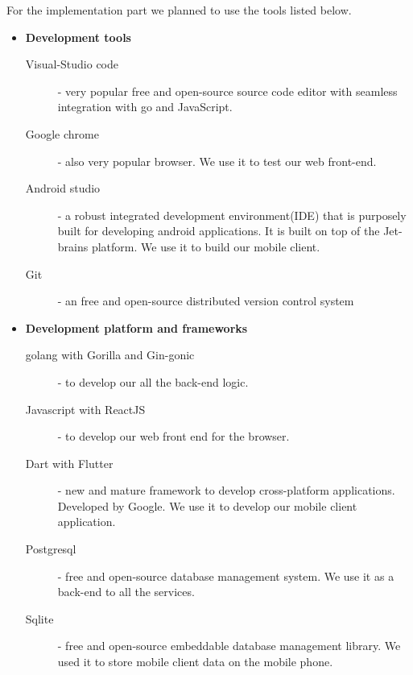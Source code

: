 For the implementation part we planned to use the tools listed below.
\begin{itemize}
	\item \textbf{Development tools}
	\begin{description}
		\item[Visual-Studio code] - very popular free and open-source source code editor with seamless integration with go and JavaScript.
		\item[Google chrome] - also very popular browser. We use it to test our web front-end.
		\item[Android studio] - a robust integrated development environment(IDE) that is purposely built for developing android applications. It is built on top of the Jet-brains platform. We use it to build our mobile client.
		\item[Git] - an free and open-source distributed version control system
	\end{description}
	\item \textbf{Development platform and frameworks}
	\begin{description}
		\item[golang with Gorilla and Gin-gonic] - to develop our all the back-end logic.
		\item[Javascript with ReactJS] - to develop our web front end for the browser.
		\item[Dart with Flutter] - new and mature framework to develop cross-platform applications. Developed by Google. We use it to develop our mobile client application.
		\item[Postgresql] - free and open-source database management system. We use it as a back-end to all the services.
		\item[Sqlite] - free and open-source embeddable database management library. We used it to store mobile client data on the mobile phone.
	\end{description}


\end{itemize}
